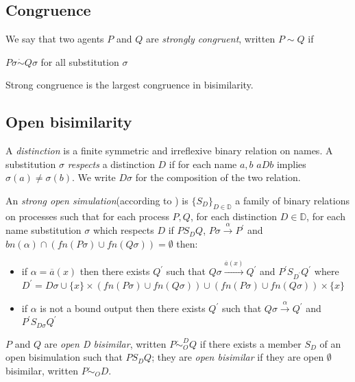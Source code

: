 \subsection{Congruence}

\begin{definition}
  We say that two agents $P$ and $Q$ are \emph{strongly congruent}, written $P\sim Q$ if
  \begin{center}
    $P\sigma \dot{\sim} Q\sigma$ for all substitution $\sigma$    
  \end{center}
\end{definition}

\begin{proposition}
  Strong congruence is the largest congruence in bisimilarity.
\end{proposition}


\subsection{Open bisimilarity}

\begin{definition}
  A \emph{distinction} is a finite symmetric and irreflexive binary relation on names. A substitution $\sigma$ \emph{respects} a distinction $D$ if for each name $a,b$ $aDb$ implies $\sigma(a)\neq \sigma(b)$. We write $D\sigma$ for the composition of the two relation.
\end{definition}


\begin{definition}
  An \emph{strong open simulation}(according to \cite{parrow}) is $\{S_{D}\}_{D\in \mathbb{D}}$ a family of binary relations on processes such that for each process $P, Q$, for each distinction $D\in \mathbb{D}$, for each name substitution $\sigma$ which respects $D$ if $P S_{D} Q$, $P\sigma \xrightarrow{\alpha} P^{'}$ and $bn(\alpha)\cap (fn(P\sigma)\cup fn(Q\sigma))=\emptyset$ then:
   \begin{itemize}
    \item 
      if $\alpha=\overline{a}(x)$ then there exists $Q^{'}$ such that $Q\sigma \xrightarrow{\overline{a}(x)} Q^{'}$ and $P^{'} S_{D^{'}} Q^{'}$ where $D^{'}=D\sigma \cup \{x\}\times (fn(P\sigma)\cup fn(Q\sigma)) \cup  (fn(P\sigma)\cup fn(Q\sigma))\times\{x\}$
    \item
      if $\alpha$ is not a bound output then there exists $Q^{'}$ such that $Q\sigma \xrightarrow{\alpha} Q^{'}$ and $P^{'} S_{D\sigma} Q^{'}$
  \end{itemize}
  $P$ and $Q$ are \emph{open D bisimilar}, written $P \dot{\sim}_{O}^{D} Q$ if there exists a member $S_{D}$ of an open bisimulation such that $P S_{D} Q$; they are \emph{open bisimilar} if they are open $\emptyset$ bisimilar, written $P \dot{\sim}_{O} D$.
 

\end{definition}
 
 















